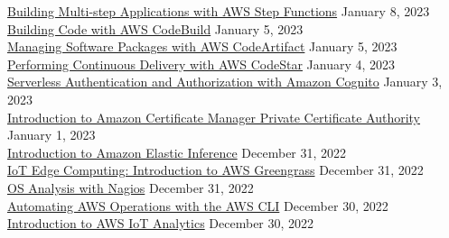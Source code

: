 \documentclass[10pt]{res} %
\begin{document}
\begin{resume}
\href{https://bjdelacruz.dev/files/certificates/pluralsight/Building_Multi_step_Applications_with_AWS_Step_Functions.pdf}{\color{blue}Building Multi-step Applications with AWS Step Functions} \hfill January 8, 2023 \\
\href{https://bjdelacruz.dev/files/certificates/pluralsight/Building_Code_with_AWS_CodeBuild.pdf}{\color{blue}Building Code with AWS CodeBuild} \hfill January 5, 2023 \\
\href{https://bjdelacruz.dev/files/certificates/pluralsight/Managing_Software_Packages_with_AWS_CodeArtifact.pdf}{\color{blue}Managing Software Packages with AWS CodeArtifact} \hfill January 5, 2023 \\
\href{https://bjdelacruz.dev/files/certificates/pluralsight/Performing_Continuous_Delivery_with_AWS_CodeStar.pdf}{\color{blue}Performing Continuous Delivery with AWS CodeStar} \hfill January 4, 2023 \\
\href{https://bjdelacruz.dev/files/certificates/pluralsight/Serverless_Authentication_and_Authorization_with_Amazon_Cognito.pdf}{\color{blue}Serverless Authentication and Authorization with Amazon Cognito} \hfill January 3, 2023 \\
\href{https://bjdelacruz.dev/files/certificates/pluralsight/Introduction_to_Amazon_Certificate_Manager_Private_Certificate_Authority.pdf}{\color{blue}Introduction to Amazon Certificate Manager Private Certificate Authority} \hfill January 1, 2023 \\
\href{https://bjdelacruz.dev/files/certificates/pluralsight/Introduction_to_Amazon_Elastic_Inference.pdf}{\color{blue}Introduction to Amazon Elastic Inference} \hfill December 31, 2022 \\
\href{https://bjdelacruz.dev/files/certificates/pluralsight/IoT_Edge_Computing_Introduction_to_AWS_Greengrass.pdf}{\color{blue}IoT Edge Computing: Introduction to AWS Greengrass} \hfill December 31, 2022 \\
\href{https://bjdelacruz.dev/files/certificates/pluralsight/13_OS_Analysis_with_Nagios.pdf}{\color{blue}OS Analysis with Nagios} \hfill December 31, 2022 \\
\href{https://bjdelacruz.dev/files/certificates/pluralsight/Automating_AWS_Operations_with_the_AWS_CLI.pdf}{\color{blue}Automating AWS Operations with the AWS CLI} \hfill December 30, 2022 \\
\href{https://bjdelacruz.dev/files/certificates/pluralsight/Introduction_to_AWS_IoT_Analytics.pdf}{\color{blue}Introduction to AWS IoT Analytics} \hfill December 30, 2022 \\

\end{resume}
\end{document}
